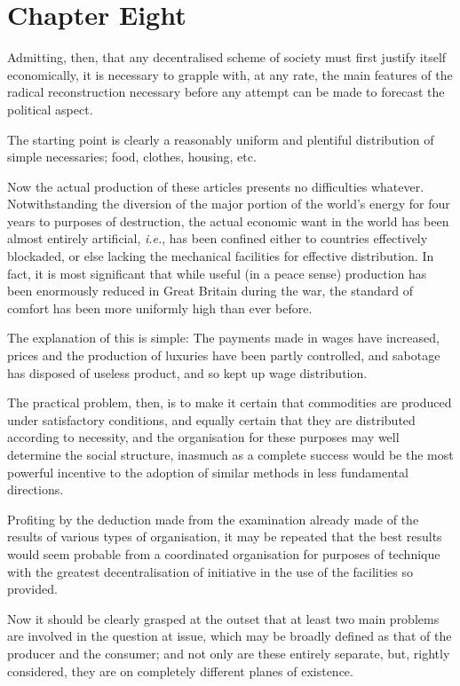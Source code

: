 \documentclass{book}
\begin{document}
\chapter{Chapter Eight}
\label{chapter-8}
Admitting, then, that any decentralised scheme of society must first justify itself economically, it is necessary to grapple with, at any rate, the main features of the radical reconstruction necessary before any attempt can be made to forecast the political aspect.

The starting point is clearly a reasonably uniform and plentiful distribution of simple necessaries; food, clothes, housing, etc.

Now the actual production of these articles presents no difficulties whatever. Notwithstanding the diversion of the major portion of the world’s energy for four years to purposes of destruction, the actual economic want in the world has been almost entirely artificial, \emph{i.e.}, has been confined either to countries effectively blockaded, or else lacking the mechanical facilities for effective distribution. In fact, it is most significant that while useful (in a peace sense) production has been enormously reduced in Great Britain during the war, the standard of comfort has been more uniformly high than ever before.

The explanation of this is simple: The payments made in wages have increased, prices and the production of luxuries have been partly controlled, and sabotage has disposed of useless product, and so kept up wage distribution.

The practical problem, then, is to make it certain that commodities are produced under satisfactory conditions, and equally certain that they are distributed according to necessity, and the organisation for these purposes may well determine the social structure, inasmuch as a complete success would be the most powerful incentive to the adoption of similar methods in less fundamental directions.

Profiting by the deduction made from the examination already made of the results of various types of organisation, it may be repeated that the best results would seem probable from a coordinated organisation for purposes of technique with the greatest decentralisation of initiative in the use of the facilities so provided.

Now it should be clearly grasped at the outset that at least two main problems are involved in the question at issue, which may be broadly defined as that of the producer and the consumer; and not only are these entirely separate, but, rightly considered, they are on completely different planes of existence.
\end{document}
